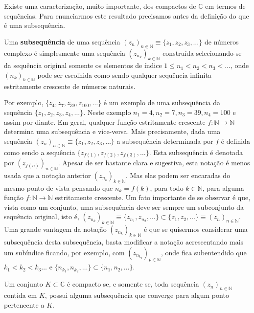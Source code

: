 Existe uma caracterização, muito importante, dos compactos de $\mathbb{C}$ 
em termos de sequências. Para enunciarmos este resultado precisamos antes da definição 
do que é uma subsequência.

Uma {\bf subsequência} de uma 
sequência $(z_n)_{n\in\mathbb{N}}\equiv \{z_1,z_2,z_3,\ldots\}$ de números complexo 
é simplesmente uma sequência $(z_{n_k})_{k\in\mathbb{N}}$ construída selecionando-se da sequência original
somente os elementos de índice $1\leqslant n_1<n_2<n_3<\ldots$, onde $(n_k)_{k\in\mathbb{N}}$ pode ser escolhida como 
sendo qualquer sequência infinita estritamente crescente de números naturais.

Por exemplo, $\{z_{4},z_{7},z_{39},z_{100},\ldots\}$ é um exemplo de uma subsequência da 
sequência $\{z_1,z_2,z_3,z_4,\ldots\}$. Neste exemplo $n_1=4, n_2=7, n_3=39, n_4=100$ e assim por diante.
Em geral, qualquer função estritamente crescente $f:\mathbb{N}\to\mathbb{N}$ 
determina uma subsequência e vice-versa. Mais precisamente, dada uma sequência 
$(z_n)_{n\in\mathbb{N}}\equiv\{z_1,z_2,z_3,\ldots\}$ a subsequência determinada por $f$ é 
definida como sendo a sequência $\{z_{f(1)},z_{f(2)},z_{f(3)},\ldots\}$. 
Esta subsequência é denotada por $(z_{f(n)})_{n\in\mathbb{N}}$. Apesar de ser bastante
clara e sugestiva, esta notação é menos usada que a notação anterior $(z_{n_k})_{k\in\mathbb{N}}$.
Mas elas podem ser encaradas do mesmo ponto de vista pensando que $n_k=f(k)$, para todo $k\in\mathbb{N}$,
para alguma função $f:\mathbb{N}\to\mathbb{N}$ estritamente crescente. 
Um fato importante de se observar é que, vista como um conjunto, uma subsequência deve ser sempre 
um subconjunto da sequência original, isto é, $(z_{n_k})_{k\in\mathbb{N}}\equiv \{z_{n_1},z_{n_2},\ldots\}
\subset \{z_1,z_2,\ldots\}\equiv (z_n)_{n\in\mathbb{N}}$. Uma grande vantagem da notação 
$(z_{n_k})_{k\in\mathbb{N}}$ é que 
se quisermos considerar uma subsequência desta subsequência, 
basta modificar a notação acrescentando mais um subíndice ficando, por exemplo, 
com $(z_{n_{k_{p}}})_{p\in\mathbb{N}}$, onde fica subentendido que $k_1<k_2<k_3\ldots$ e  
$\{n_{k_1},n_{k_2},\ldots\}\subset \{n_1,n_2,\ldots\}$.


\begin{teorema}
Um conjunto $K\subset \mathbb{C}$ é compacto se, e somente se, toda sequência $(z_n)_{n\in\mathbb{N}}$
contida em $K$, possui alguma subsequência que converge para algum ponto pertencente a $K$.
\end{teorema}

